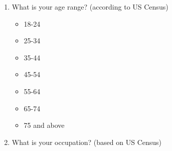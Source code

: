 \begin{enumerate}
    \item What is your age range? (according to US Census)
    \begin{itemize}
        \item 18-24
        \item 25-34
        \item 35-44
        \item 45-54
        \item 55-64
        \item 65-74
        \item 75 and above
    \end{itemize}

    \item What is your occupation? (based on US Census)


\end{enumerate}
